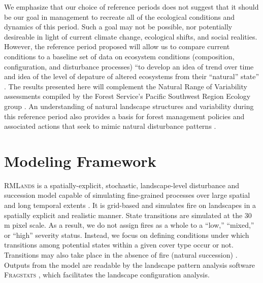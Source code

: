 We emphasize that our choice of reference periods does not suggest that it should be our goal in management to recreate all of the ecological conditions and dynamics of this period. Such a goal may not be possible, nor potentially desireable in light of current climate change, ecological shifts, and social realities. However, the reference period proposed will allow us to compare current conditions to a baseline set of data on ecosystem conditions (composition, configuration, and disturbance processes) ``to develop an idea of trend over time and idea of the level of depature of altered ecosystems from their ``natural'' state'' \citep{Safford2013}. The results presented here will complement the Natural Range of Variability assessments compiled by the Forest Service's Pacific Southwest Region Ecology group \citep[e.g.,][]{Safford2013,Merriam2013,Meyer2013a,Meyer2013,Estes2013,Estes2013a,Gross2013}. An understanding of natural landscape structures and variability during this reference period also provides a basis for forest management policies and associated actions that seek to mimic natural disturbance patterns \citep{Romme2000,Buse2002}. 






\section{Modeling Framework}

\textsc{RMLands} is a spatially-explicit, stochastic, landscape-level disturbance and succession model capable of simulating fine-grained processes over large spatial and long temporal extents \citep{McGarigal2005}. It is grid-based and simulates fire on landscapes in a spatially explicit and realistic manner. State transitions are simulated at the 30 m pixel scale. As a result, we do not assign fires as a whole to a ``low,'' ``mixed,'' or ``high'' severity status. Instead, we focus on defining conditions under which transitions among potential states within a given cover type occur or not. Transitions may also take place in the absence of fire (natural succession) \citep{McGarigal2012}. Outputs from the model are readable by the landscape pattern analysis software \textsc{Fragstats} \citep{Fragstats2012}, which facilitates the landscape configuration analysis.

